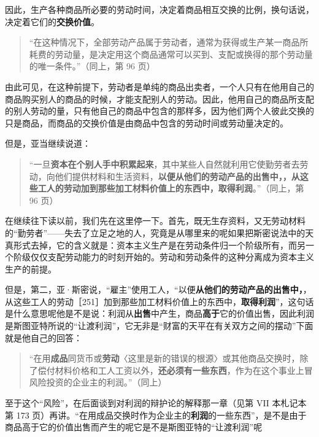 因此，生产各种商品所必要的劳动时间，决定着商品相互交换的比例，换句话说，决定着它们的\textbf{交换价值}。

\begin{quote}“在这种情况下，全部劳动产品属于劳动者，通常为获得或生产某一商品所耗费的劳动量，是决定用这个商品通常可以买到、支配或换得的那个劳动量的唯一条件。”（同上，第 96 页）\end{quote}

由此可见，在这种前提下，劳动者是单纯的商品出卖者，一个人只有在他用自己的商品购买别人的商品的时候，才能支配别人的劳动。因此，他用自己的商品所支配的别人劳动的量，只有他自己的商品中包含的那样多，因为他们两个人彼此交换的只是商品，而商品的交换价值是由商品中包含的劳动时间或劳动量决定的。

但是，亚当继续说道：

\begin{quote}“一旦\textbf{资本在个别人手中积累起来}，其中某些人自然就利用它使勤劳者去劳动，向他们提供材料和生活资料，\textbf{以便从他们的劳动产品的出售中，，从这些工人的劳动加到那些加工材料价值上的东西中，取得利润}。”（同上，第 96 页）\end{quote}

在继续往下读以前，我们先在这里停一下。首先，既无生存资料，又无劳动材料的“勤劳者”——失去了立足之地的人，究竟是从哪里来的呢如果把斯密说法中的天真形式去掉，它的含义就是：资本主义生产是在劳动条件归一个阶级所有，而另一个阶级仅仅支配劳动能力的时刻开始的。劳动和劳动条件的这种分离成为资本主义生产的前提。

但是，第二，亚·斯密说，“雇主”使用工人，“以便\textbf{从他们的劳动产品的出售中，}，从这些工人的劳动［251］加到那些加工材料价值上的东西中，\textbf{取得利润}”，这句话是什么意思呢他是不是说：利润从\textbf{出售}中产生，商品\textbf{高于}它的价值出售，因此利润是斯图亚特所说的“让渡利润”，它无非是“财富的天平在有关双方之间的摆动”下面就是他自己的回答：

\begin{quote}“在用\textbf{成品}同货币或\textbf{劳动}〈这里是新的错误的根源〉或其他商品交换时，除了偿付材料价格和工人工资以外，\textbf{还必须有一些东西}，作为在这个事业上冒风险投资的企业主的利润。”（同上）\end{quote}

至于这个“风险”，在后面谈到对利润的辩护论的解释那一章（见第 VII 本札记本第 173 页）再讲。“在用成品交换时作为企业主的\textbf{利润}的一些东西”，是不是由于商品高于它的价值出售而产生的呢它是不是斯图亚特的“让渡利润”呢

